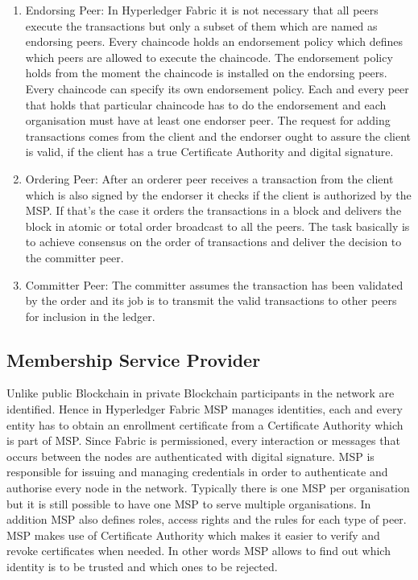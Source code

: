 \begin{enumerate}
\item Endorsing Peer: In Hyperledger Fabric it is not necessary that all peers execute the transactions but only a subset of them which are named as endorsing peers. Every chaincode holds an endorsement policy which defines which peers are allowed to execute the chaincode. The endorsement policy holds from the moment the chaincode is installed on the endorsing peers. Every chaincode can specify its own endorsement policy. Each and every peer that holds that particular chaincode has to do the endorsement and each organisation must have at least one endorser peer. The request for adding transactions comes from the client and the endorser ought to assure the client is valid, if the client has a true Certificate Authority and digital signature. 


\item Ordering Peer: After an orderer peer receives a transaction from the client which is also signed by the endorser it checks if the client is authorized by the MSP. If that's the case it orders the transactions in a block and delivers the block in atomic or total order broadcast to all the peers. The task basically is to achieve consensus on the order of transactions and deliver the decision to the committer peer. 
\item Committer Peer: The committer assumes the transaction has been validated by the order and its job is to transmit the valid transactions to other peers for inclusion in the ledger. 
\end{enumerate}



\subsection{Membership Service Provider}
Unlike public Blockchain in private Blockchain participants in the network are identified. Hence in Hyperledger Fabric 
MSP manages identities, each  and every entity has to obtain an enrollment certificate from a Certificate Authority which is part of MSP. Since Fabric is permissioned, every interaction or messages that occurs between the nodes are authenticated with digital signature. MSP is responsible for issuing and managing credentials in order to authenticate and authorise every node in the network. Typically there is one MSP per organisation but it is still possible to have one MSP to serve multiple organisations. In addition MSP also defines roles, access rights and the rules for each type of peer. MSP makes use of Certificate Authority which makes it easier to verify and revoke certificates when needed. In other words MSP allows to find out which identity is to be trusted and which ones to be rejected. 

